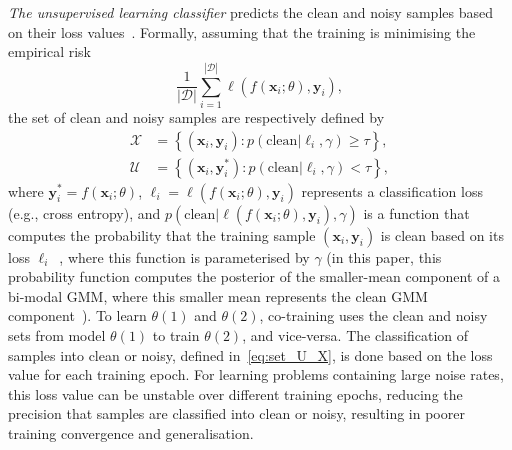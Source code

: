 \documentclass[review]{elsarticle}
\begin{document}
\textit{The unsupervised learning classifier} predicts the clean and noisy samples based on their loss values~\cite{arazo2019unsupervised, li2020dividemix,rog, jiang2020beyond}. 
Formally, assuming that the training is minimising the empirical risk 
\begin{equation}
\frac{1}{|\mathcal{D}|}\sum_{i=1}^{|\mathcal{D}|} \ell(f(\mathbf{x}_i;\theta),\mathbf{y}_i),
\label{eq:ERM}
\end{equation}
the set of clean and noisy samples are respectively defined by 
\begin{equation}
\begin{split}
\mathcal{X} &= \left \{ (\mathbf{x}_i,\mathbf{y}_i) : p \left ( \text{clean} | \ell_i , \gamma \right ) \ge \tau \right \}, \\
\mathcal{U} &= \left \{ (\mathbf{x}_i,\mathbf{y}_i^{*}) : 
p \left ( \text{clean} | \ell_i , \gamma \right ) < \tau \right \}, 
\end{split}
\label{eq:set_U_X}
\end{equation}
where $\mathbf{y}_i^{*} = f(\mathbf{x}_i;\theta)$,
$\ell_i = \ell( f (\mathbf{x}_i;\theta),\mathbf{y}_i)$ represents a classification loss (e.g., cross entropy),
and $p \left ( \text{clean} | \ell( f(\mathbf{x}_i;\theta),\mathbf{y}_i) , \gamma \right )$
 is a function that computes the probability that the training sample $(\mathbf{x}_i,\mathbf{y}_i)$ is clean based on its loss $\ell_i$~\cite{jiang2020beyond, li2020dividemix, zhang2020distilling,nguyen2019self}, where this function is parameterised by $\gamma$ (in this paper, this probability function computes the posterior of the smaller-mean component of a bi-modal GMM, where this smaller mean represents the clean GMM component~\cite{li2020dividemix}). To learn $\theta(1)$ and $\theta(2)$, co-training uses the clean and noisy sets from model $\theta(1)$ to train $\theta(2)$, and vice-versa. The classification of samples into clean or noisy, defined in~\eqref{eq:set_U_X}, is done based on the loss value for each training epoch. 
 For learning problems containing large noise rates, this loss value can be unstable over different training epochs, reducing the precision that samples are classified into clean or noisy, resulting in poorer training convergence and generalisation.
\end{document}
